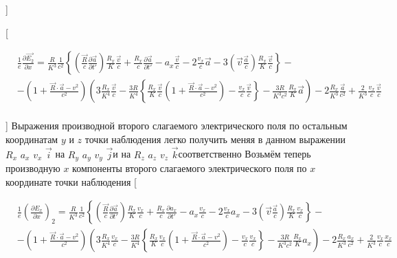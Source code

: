 \documentclass[11pt]{article}
\begin{document}
{]}

{[}

\begin{align}
  & \frac{1}{e}\frac{\partial \overrightarrow{{{E}_{2}}}}{\partial x}=\frac{R}{{{K}^{3}}}\frac{1}{{{c}^{2}}}\left\{ \left( \frac{\overrightarrow{R}}{c}\frac{\partial \overrightarrow{a}}{\partial t'} \right)\frac{{{R}_{x}}}{K}\frac{\overrightarrow{v}}{c}+\frac{{{R}_{x}}}{c}\frac{\partial \overrightarrow{a}}{\partial t'}-{{a}_{x}}\frac{\overrightarrow{v}}{c}-2\frac{{{v}_{x}}}{c}\overrightarrow{a}-3\left( \overrightarrow{v}\frac{\overrightarrow{a}}{c} \right)\frac{{{R}_{x}}}{K}\frac{\overrightarrow{v}}{c} \right\}- \\ 
 & -\left( 1+\frac{\overrightarrow{R}\cdot \overrightarrow{a}-{{v}^{2}}}{{{c}^{2}}} \right)\left( 3\frac{{{R}_{x}}}{{{K}^{4}}}\frac{\overrightarrow{v}}{c}-\frac{3R}{{{K}^{4}}}\left\{ \frac{{{R}_{x}}}{K}\frac{\overrightarrow{v}}{c}\left( 1+\frac{\overrightarrow{R}\cdot \overrightarrow{a}-{{v}^{2}}}{{{c}^{2}}} \right)-\frac{{{v}_{x}}}{c}\frac{\overrightarrow{v}}{c} \right\}-\frac{3R}{{{K}^{3}}{{c}^{2}}}\frac{{{R}_{x}}}{K}\overrightarrow{a} \right)-2\frac{{{R}_{x}}}{{{K}^{3}}}\frac{\overrightarrow{a}}{{{c}^{2}}}+\frac{2}{{{K}^{3}}}\frac{{{v}_{x}}}{c}\frac{\overrightarrow{v}}{c} \\ 
\end{align}

{]} Выражения производной второго слагаемого электрического поля по
остальным координатам \(y\) и \(z\) точки наблюдения легко получить
меняя в данном выражении \({{R}_{x}}\) \({{a}_{x}}\) \({{v}_{x}}\)
\(\overrightarrow{i}\) на \({{R}_{y}}\) \({{a}_{y}}\) \({{v}_{y}}\)
\(\overrightarrow{j}\)и на \({{R}_{z}}\) \({{a}_{z}}\) \({{v}_{z}}\)
\(\overrightarrow{k}\)соответственно Возьмём теперь производную \(x\)
компоненты второго слагаемого электрического поля по \(x\) координате
точки наблюдения {[}

\begin{align}
  & \frac{1}{e}{{\left( \frac{\partial {{E}_{x}}}{\partial x} \right)}_{2}}=\frac{R}{{{K}^{3}}}\frac{1}{{{c}^{2}}}\left\{ \left( \frac{\overrightarrow{R}}{c}\frac{\partial \overrightarrow{a}}{\partial t'} \right)\frac{{{R}_{x}}}{K}\frac{{{v}_{x}}}{c}+\frac{{{R}_{x}}}{c}\frac{\partial {{a}_{x}}}{\partial t'}-{{a}_{x}}\frac{{{v}_{x}}}{c}-2\frac{{{v}_{x}}}{c}{{a}_{x}}-3\left( \overrightarrow{v}\frac{\overrightarrow{a}}{c} \right)\frac{{{R}_{x}}}{K}\frac{{{v}_{x}}}{c} \right\}- \\ 
 & -\left( 1+\frac{\overrightarrow{R}\cdot \overrightarrow{a}-{{v}^{2}}}{{{c}^{2}}} \right)\left( 3\frac{{{R}_{x}}}{{{K}^{4}}}\frac{{{v}_{x}}}{c}-\frac{3R}{{{K}^{4}}}\left\{ \frac{{{R}_{x}}}{K}\frac{{{v}_{x}}}{c}\left( 1+\frac{\overrightarrow{R}\cdot \overrightarrow{a}-{{v}^{2}}}{{{c}^{2}}} \right)-\frac{{{v}_{x}}}{c}\frac{{{v}_{x}}}{c} \right\}-\frac{3R}{{{K}^{3}}{{c}^{2}}}\frac{{{R}_{x}}}{K}{{a}_{x}} \right)-2\frac{{{R}_{x}}}{{{K}^{3}}}\frac{{{a}_{x}}}{{{c}^{2}}}+\frac{2}{{{K}^{3}}}\frac{{{v}_{x}}}{c}\frac{{{x}_{x}}}{c} \\ 
\end{align}
\end{document}
